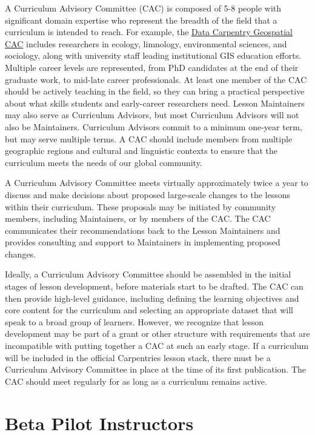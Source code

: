 \documentclass[
]{book}
\begin{document}
A Curriculum Advisory Committee (CAC)
is composed of 5-8 people with significant domain expertise who represent the
breadth of the field that a curriculum is intended to reach. For example, the
\href{https://datacarpentry.org/lesson-leadership/}{Data Carpentry Geospatial CAC}
includes researchers in ecology, limnology, environmental sciences, and sociology,
along with university staff leading institutional GIS education efforts. Multiple
career levels are represented, from PhD candidates at the end of their graduate
work, to mid-late career professionals. At least one member of the CAC should
be actively teaching in the field, so they can bring a practical perspective
about what skills students and early-career researchers need. Lesson Maintainers
may also serve as Curriculum Advisors, but most Curriculum Advisors will not
also be Maintainers. Curriculum Advisors commit to a minimum one-year term, but
may serve multiple terms. A CAC should include members from multiple geographic
regions and cultural and linguistic contexts to ensure that the curriculum
meets the needs of our global community.

A Curriculum Advisory Committee meets virtually approximately twice a year to
discuss and make decisions about proposed large-scale
changes to the lessons within their curriculum. These proposals may be initiated
by community members, including Maintainers, or by members of the CAC. The CAC
communicates their recommendations back to the Lesson Maintainers and provides
consulting and support to Maintainers in implementing proposed changes.

Ideally, a Curriculum Advisory Committee should be assembled in the initial
stages of lesson development, before materials start to be drafted. The CAC
can then provide high-level guidance, including defining the learning objectives
and core content for the curriculum and selecting an appropriate dataset that
will speak to a broad group of learners. However, we recognize that lesson
development may be part of a grant or other structure with requirements that are
incompatible with putting together a CAC at such an early stage. If a curriculum
will be included in the official Carpentries lesson stack, there
must be a Curriculum Advisory Committee in place at the time of
its first publication. The CAC should meet regularly for as long as a curriculum
remains active.

\hypertarget{beta-pilot-instructors}{%
\section{Beta Pilot Instructors}\label{beta-pilot-instructors}}
\end{document}

